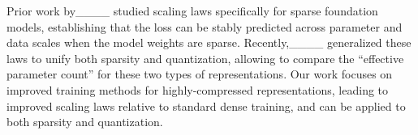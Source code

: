 Prior work by____ studied scaling laws specifically for sparse foundation models, establishing that the loss can be stably predicted across parameter and data scales when the model weights are sparse. Recently,____ generalized these laws to unify both sparsity and quantization, allowing to compare the ``effective parameter count'' for these two types of representations. Our work focuses on improved training methods for highly-compressed representations, leading to improved scaling laws relative to standard dense training, and can be applied to both sparsity and quantization.  


\vspace{-0.7em}